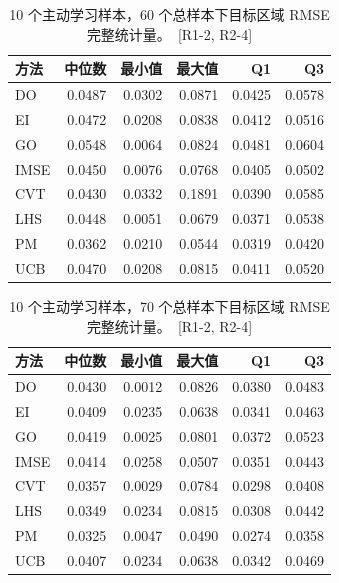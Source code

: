 \documentclass[]{interact}
\DeclareRobustCommand{\reviewadd}[2]{{\color{red}#1}\ {\color{blue}\footnotesize[#2]}}
\theoremstyle{plain}%
\theoremstyle{definition}
\theoremstyle{remark}
\begin{document}
\begin{table}[h!]
	\centering
	\caption{\reviewadd{10 个主动学习样本，60 个总样本下目标区域 RMSE 完整统计量。}{R1-2, R2-4}}
	\label{tab:app_a3}
	\begin{tabular}{l rrrrr}
		\toprule
		方法 & 中位数 & 最小值 & 最大值 & Q1 & Q3 \\
		\midrule
		DO   & 0.0487 & 0.0302 & 0.0871 & 0.0425 & 0.0578 \\
		EI   & 0.0472 & 0.0208 & 0.0838 & 0.0412 & 0.0516 \\
		GO   & 0.0548 & 0.0064 & 0.0824 & 0.0481 & 0.0604 \\
		IMSE & 0.0450 & 0.0076 & 0.0768 & 0.0405 & 0.0502 \\
		CVT  & 0.0430 & 0.0332 & 0.1891 & 0.0390 & 0.0585 \\
		LHS  & 0.0448 & 0.0051 & 0.0679 & 0.0371 & 0.0538 \\
		PM   & 0.0362 & 0.0210 & 0.0544 & 0.0319 & 0.0420 \\
		UCB  & 0.0470 & 0.0208 & 0.0815 & 0.0411 & 0.0520 \\
		\bottomrule
	\end{tabular}
\end{table}

\begin{table}[h!]
	\centering
	\caption{\reviewadd{10 个主动学习样本，70 个总样本下目标区域 RMSE 完整统计量。}{R1-2, R2-4}}
	\label{tab:app_a4}
	\begin{tabular}{l rrrrr}
		\toprule
		方法 & 中位数 & 最小值 & 最大值 & Q1 & Q3 \\
		\midrule
		DO   & 0.0430 & 0.0012 & 0.0826 & 0.0380 & 0.0483 \\
		EI   & 0.0409 & 0.0235 & 0.0638 & 0.0341 & 0.0463 \\
		GO   & 0.0419 & 0.0025 & 0.0801 & 0.0372 & 0.0523 \\
		IMSE & 0.0414 & 0.0258 & 0.0507 & 0.0351 & 0.0443 \\
		CVT  & 0.0357 & 0.0029 & 0.0784 & 0.0298 & 0.0408 \\
		LHS  & 0.0349 & 0.0234 & 0.0815 & 0.0308 & 0.0442 \\
		PM   & 0.0325 & 0.0047 & 0.0490 & 0.0274 & 0.0358 \\
		UCB  & 0.0407 & 0.0234 & 0.0638 & 0.0342 & 0.0469 \\
		\bottomrule
	\end{tabular}
\end{table}
\end{document}
